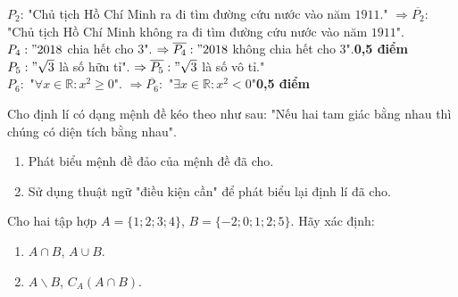 \begin{bt}
{\begin{enumerate}
			$P_2$: "Chủ tịch Hồ Chí Minh ra đi tìm đường cứu nước vào năm $1911$." $\Rightarrow\overline{P_2}:$ "Chủ tịch Hồ Chí Minh không ra đi tìm đường cứu nước vào năm $1911$".\\
			$P_4:"2018$ chia hết cho $3$". $\Rightarrow \overline{P_4}:"2018$ không chia hết cho $3$".\dotfill \textbf{0,5 điểm}\\
			$P_5: "\sqrt{3}$ là số hữu tỉ". $\Rightarrow \overline{P_5}: "\sqrt{3}$ là số vô tỉ."\\
			$P_6:$ "$\forall x\in \mathbb{R}:x^2\geq 0$". $\Rightarrow \overline{P_6}:$ "$\exists x\in \mathbb{R}: x^2<0$"\dotfill \textbf{0,5 điểm}
		\end{enumerate}
	}
\end{bt}

\begin{bt}%
	Cho định lí có dạng mệnh đề kéo theo như sau: "Nếu hai tam giác bằng nhau thì chúng có diện tích bằng nhau".
	\begin{enumerate}
		\item Phát biểu mệnh đề đảo của mệnh đề đã cho.
		\item Sử dụng thuật ngữ "điều kiện cần" để phát biểu lại định lí đã cho.
	\end{enumerate}
\end{bt}

\begin{bt}%
	Cho hai tập hợp $A=\{1;2;3;4\}$, $B=\{-2;0;1;2;5\}$. Hãy xác định:
	\begin{enumerate}
		\item $A\cap B$, $A\cup B$.
		\item $A\backslash B$, $C_{A}\left(A\cap B\right)$.
	\end{enumerate}
\end{bt}

